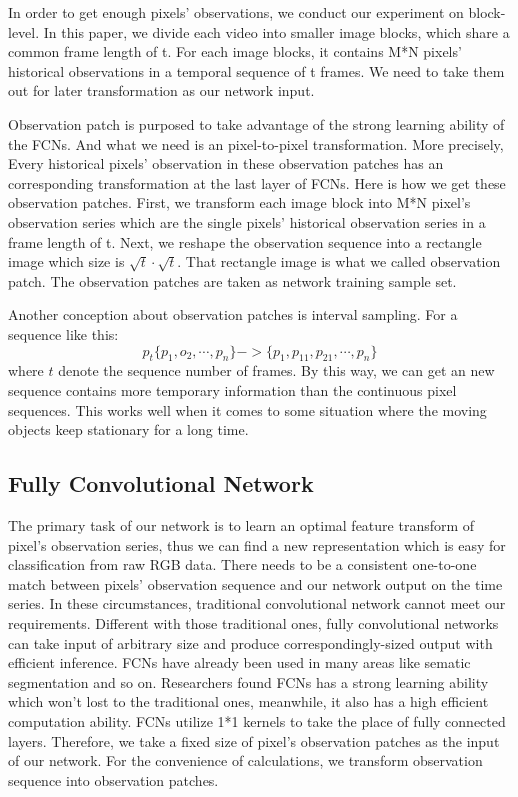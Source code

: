 \documentclass[journal]{IEEEtran}
\begin{document}
In order to get enough pixels’ observations, we conduct our experiment on block-level.
In this paper, we divide each video into smaller image blocks, which share a common frame length of t.
For each image blocks, it contains M*N pixels’ historical observations in a temporal sequence of t frames.
We need to take them out for later transformation as our network input.

Observation patch is purposed to take advantage of the strong learning ability of the FCNs.
And what we need is an pixel-to-pixel transformation.
More precisely, Every historical pixels’ observation in these observation patches has an corresponding transformation  at the last layer of FCNs.
Here is how we get these observation patches.
First, we transform each image block into M*N pixel’s observation series which are the  single pixels’ historical observation series in a frame length of t.
Next, we reshape the observation sequence into a rectangle image which size is $\sqrt{t}\cdot \sqrt{t}$.
That rectangle image is what we called observation patch.
The observation patches are taken as network training sample set.

Another conception about observation patches is interval sampling.
For a sequence like this: 
\begin{equation}
    p_t\{p_1,o_2,\cdots,p_n\} -> \{p_1,p_{11},p_{21}, \cdots, p_n\}
\end{equation}
where $t$
denote the sequence number of frames.
By this way, we can get an new sequence contains more temporary information  than the continuous pixel sequences.
This works well when it comes to some situation where the moving objects keep stationary for a long time.


 
\subsection{Fully Convolutional Network}
\label{sec3_bc}
The primary task of our network is to learn an optimal feature transform of pixel’s observation series, thus we can find a new representation which is easy for classification from raw RGB data. There needs to be a consistent one-to-one match between pixels’ observation sequence and our network output on the time series. In these circumstances, traditional convolutional network cannot meet our requirements. 
Different with those traditional ones, fully convolutional networks can take input of arbitrary size and produce correspondingly-sized output with efficient inference. FCNs have already been used in many areas like sematic segmentation and so on. Researchers found FCNs has a strong learning ability which won’t lost to the traditional ones, meanwhile, it also has a high efficient computation ability.   
FCNs utilize 1*1 kernels to take the place of fully connected layers.
Therefore, we take a fixed size of pixel’s observation patches as the input of our network. For the convenience of calculations, we transform observation sequence into observation patches.
\end{document}
